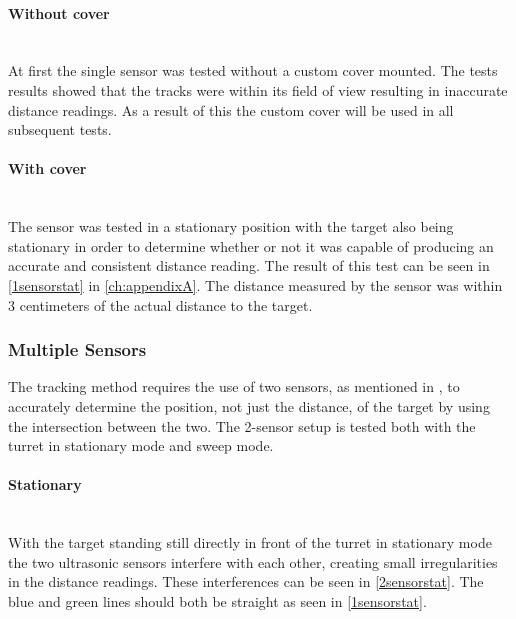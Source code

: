 \paragraph{Without cover} ~\\
At first the single sensor was tested without a custom cover mounted. The tests results showed that the tracks were within its field of view resulting in inaccurate distance readings. As a result of this the custom cover will be used in all subsequent tests.

\paragraph{With cover} ~\\
The sensor was tested in a stationary position with the target also being stationary in order to determine whether or not it was capable of producing an accurate and consistent distance reading. The result of this test can be seen in \cref{1sensorstat} in \cref{ch:appendixA}. The distance measured by the sensor was within 3 centimeters of the actual distance to the target.

\subsubsection{Multiple Sensors}
The tracking method requires the use of two sensors, as mentioned in , to accurately determine the position, not just the distance, of the target by using the intersection between the two. The 2-sensor setup is tested both with the turret in stationary mode and sweep mode.

\paragraph{Stationary} ~\\
With the target standing still directly in front of the turret in stationary mode the two ultrasonic sensors interfere with each other, creating small irregularities in the distance readings. These interferences can be seen in \cref{2sensorstat}. The blue and green lines should both be straight as seen in \cref{1sensorstat}. \\


\vspace{0.5pt}

